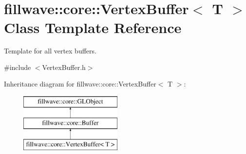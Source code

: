 \hypertarget{classfillwave_1_1core_1_1VertexBuffer}{}\section{fillwave\+:\+:core\+:\+:Vertex\+Buffer$<$ T $>$ Class Template Reference}
\label{classfillwave_1_1core_1_1VertexBuffer}


Template for all vertex buffers.  




{\ttfamily \#include $<$Vertex\+Buffer.\+h$>$}

Inheritance diagram for fillwave\+:\+:core\+:\+:Vertex\+Buffer$<$ T $>$\+:\begin{figure}[H]
\begin{center}
\leavevmode
\includegraphics[height=3.000000cm]{classfillwave_1_1core_1_1VertexBuffer}
\end{center}
\end{figure}
